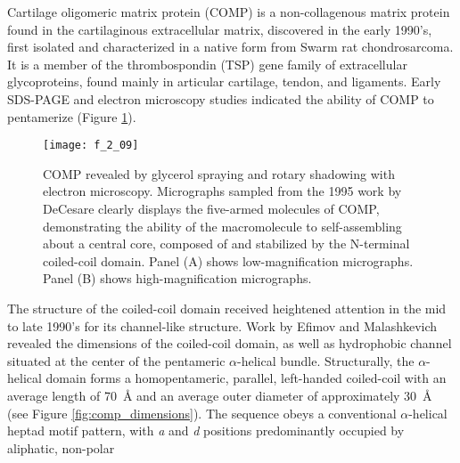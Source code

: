 \begin{refsection}
Cartilage oligomeric matrix protein (COMP) is a non-collagenous matrix protein
found in the cartilaginous extracellular matrix, discovered in the early 1990's,
first isolated and characterized in a native form from Swarm rat
chondrosarcoma.\cite{Morgelin1992} It is a member of the thrombospondin (TSP)
gene family of extracellular glycoproteins, found mainly in articular cartilage,
tendon, and
ligaments.\cite{Adams2001,Smith1997,Muller1998,Hedbom1992,Oldberg1992} Early
SDS-PAGE and electron microscopy studies indicated the ability of COMP to
pentamerize (Figure \ref{fig:COMP_EM_1}).\cite{DiCesare1995,Morgelin1992} 
\begin{figure}[h!] \centering \texttt{[image: f\_2\_09]}
    \caption[COMP revealed by glycerol spraying and rotary
        shadowing with electron microscopy. Micrographs sampled from the 1995
        work by DeCesare  clearly displays the five-armed
        molecules of COMP, demonstrating the ability of the macromolecule to
        self-assembling about a central core, composed of and stabilized by the
        N-terminal coiled-coil domain. Panel (A) shows low-magnification
    micrographs. Panel (B) shows high-magnification micrographs.]{COMP revealed by glycerol spraying and rotary
        shadowing with electron microscopy. Micrographs sampled from the 1995
        work by DeCesare  clearly displays the five-armed
        molecules of COMP, demonstrating the ability of the macromolecule to
        self-assembling about a central core, composed of and stabilized by the
        N-terminal coiled-coil domain. Panel (A) shows low-magnification
    micrographs. Panel (B) shows high-magnification micrographs.\cite{DiCesare1995}}\label{fig:COMP_EM_1} \end{figure}
The structure of the coiled-coil domain received heightened attention in the mid
to late 1990's for its channel-like structure. Work by Efimov and Malashkevich
revealed the dimensions of the coiled-coil domain, as well as hydrophobic
channel situated at the center of the pentameric ${\alpha}$-helical
bundle.\cite{Efimov1996,Malashkevich1996a} Structurally, the ${\alpha}$-helical
domain forms a homopentameric, parallel, left-handed coiled-coil with an average
length of \SI{70}{\angstrom} and an average outer diameter of approximately
\SI{30}{\angstrom} (see Figure \ref{fig:comp_dimensions}). The sequence obeys a
conventional ${\alpha}$-helical heptad motif pattern, with \emph{a} and \emph{d}
positions predominantly occupied by aliphatic, non-polar

\end{refsection}
